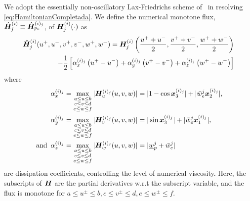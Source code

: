 We adopt the essentially non-oscillatory Lax-Friedrichs scheme of~\cite{OsherShuENO, Crandall1984Approx} in resolving \eqref{eq:HamiltonianCompletada}. We define the numerical monotone flux, 	$\hat{\bm{H}}_j^{(i)}\equiv \hat{\bm{H}}_{p_k}^{(i)_j}$, of $\bm{H}_j^{(i)}(\cdot)$ as 
%
\begin{align}
	\hat{\bm{H}}_j^{(i)}(u^+, u^-, v^+, v^-, w^+, w^-) = \bm{H}_j^{(i)}\left(\frac{u^+ +u^-}{2}, \frac{v^+ +v^-}{2}, \frac{w^+ +w^-}{2}\right) \nonumber
	\\
	- \dfrac{1}{2}\left[ \alpha_x^{(i)_j} \left(u^+ - u^-\right) + \alpha_y^{(i)_j}\left(v^+ - v^-\right) + \alpha_z^{(i)_j}\left(w^+ - w^-\right)\right]
\end{align}
%
where
%
\begin{subequations}
	\begin{align}
		\alpha_x^{(i)_j} &= \max_{\substack{ a \le u \le b \\ c \le v \le d  \\ e \le w \le f}} |\bm{H}_{u}^{(i)_j}(u, v, w)| = |1 - \cos \bm{x}_3^{(i)_j}|+ |\bar{w}_e^j \bm{x}_2^{(i)_j}|, 
		\\
		\, \alpha_y^{(i)_j} &= \max_{\substack{ a \le u \le b \\ c \le v \le d  \\ e \le w \le f}} |\bm{H}_{v}^{(i)_j}(u, v, w)| = |\sin \bm{x}_3^{(i)_j}| + |\bar{w}_e^j \bm{x}_1^{(i)_j}|, \,  \\
		\text{ and }\, \alpha_z^{(i)_j} &= \max_{\substack{ a \le u \le b \\ c \le v \le d  \\ e \le w \le f}} |\bm{H}_{w}^{(i)_j}(u, v, w)| = |\underline{w}_p^j + \bar{w}_e^j|
	\end{align}
\end{subequations}
%
are dissipation coefficients, controlling the level of numerical viscosity. Here, the subscripts of $\bm{H}$ are the partial derivatives w.r.t the subscript variable, and the flux is monotone for $a \le u^\pm \le b, c \le v^\pm \le d, e \le w^\pm \le f$.


